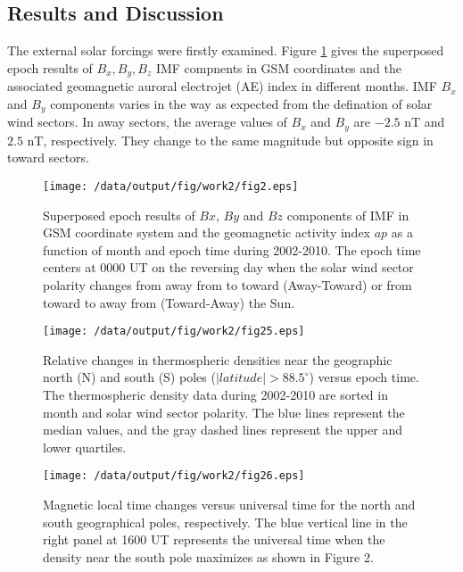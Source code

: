 \documentclass[draft,grl]{/home/gdj/文档/template/agu_template/AGUTeX}
\begin{document}
\begin{article}
\section{Results and Discussion}
    The external solar forcings were firstly examined.
    Figure \ref{figure1} gives the superposed epoch results of $B_x, B_y, B_z$ IMF compnents in GSM coordinates
    and the associated geomagnetic auroral electrojet (AE) index in different months. 
    IMF $B_x$ and $B_y$ components varies in the way as expected from the defination of solar wind sectors.
    In away sectors, the average values of $B_x$ and $B_y$ are $-2.5$ nT and $2.5$ nT, respectively.
    They change to the same magnitude but opposite sign in toward sectors.



\end{article}
\begin{figure}
    \centering
    \noindent\texttt{[image: /data/output/fig/work2/fig2.eps]}
    \caption{Superposed epoch results of $Bx$, $By$ and $Bz$ components of IMF in GSM coordinate system and the geomagnetic activity index $ap$ as a function of month and epoch time during 2002-2010. The epoch time centers at 0000 UT on the reversing day when the solar wind sector polarity changes from away from to toward (Away-Toward) or from toward to away from (Toward-Away) the Sun. }
    \label{figure1}
\end{figure}
\begin{figure}
    \centering
    \noindent\texttt{[image: /data/output/fig/work2/fig25.eps]}
    \caption{Relative changes in thermospheric densities near the geographic north (N) and south (S) poles ($\left|latitude\right| > 88.5^\circ$) versus epoch time. The thermospheric density data during 2002-2010 are sorted in month and solar wind sector polarity. The blue lines represent the median values, and the gray dashed lines represent the upper and lower quartiles.}
    \label{figure2}
\end{figure}
\begin{figure}
    \centering
    \noindent\texttt{[image: /data/output/fig/work2/fig26.eps]}
    \caption{ Magnetic local time changes versus universal time for the north and south geographical poles, respectively. The blue vertical line in the right panel at 1600 UT represents the universal time when the density near the south pole maximizes as shown in Figure 2.}
    \label{figure3}
\end{figure}
\end{document}

